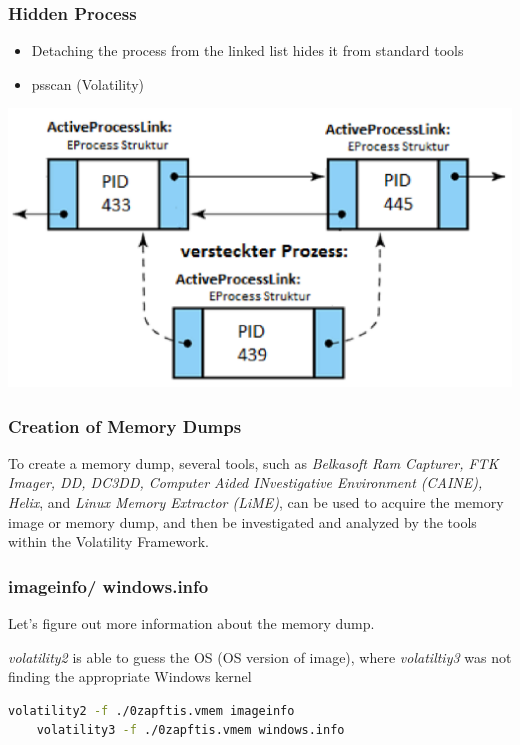 \subsubsection{Hidden Process}
\begin{itemize}
    \item Detaching the process from the linked list hides it from standard tools
    \item psscan (Volatility)
\end{itemize}
\begin{center}
    \includegraphics[width=1.0\linewidth]{./img/13-volatility/hidden_process}
    \vspace{-8pt}
\end{center}


\subsubsection{Creation of Memory Dumps}
To create a memory dump, several tools, such as \textit{Belkasoft Ram Capturer, FTK Imager, DD, DC3DD, Computer Aided INvestigative Environment (CAINE), Helix}, and \textit{Linux Memory Extractor (LiME)}, can be used to acquire the memory image or memory dump, and then be investigated and analyzed by the tools within the Volatility Framework.

\subsubsection{imageinfo/ windows.info}
Let's figure out more information about the memory dump.

\textit{volatility2} is able to guess the OS (OS version of image), where \textit{volatiltiy3} was not finding the appropriate Windows kernel

\begin{lstlisting}[language=bash]
    volatility2 -f ./0zapftis.vmem imageinfo
    volatility3 -f ./0zapftis.vmem windows.info
\end{lstlisting}


